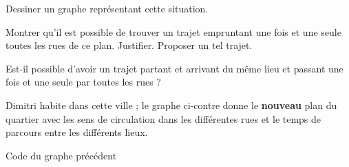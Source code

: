 \medskip
\begin{enumerate} 
\item Dessiner un graphe représentant cette situation.
\item Montrer qu'il est possible de trouver un trajet empruntant une fois et une seule toutes les rues de ce plan. Justifier. Proposer un tel trajet.

Est-il possible d'avoir un trajet partant et arrivant du même lieu et passant une fois et une seule par toutes les rues ?


\begin{minipage}[b]{0,3\textwidth}
\item
 Dimitri habite dans cette ville ; le graphe ci-contre  donne le \textbf{nouveau} plan du quartier avec les sens de circulation dans les différentes rues et le temps de parcours entre les différents lieux.
\end{minipage}
\hspace{1cm}
 \begin{minipage}[c]{0,68\textwidth}
  \end{minipage}
\end{enumerate}

\vfill\newpage
Code du graphe précédent

